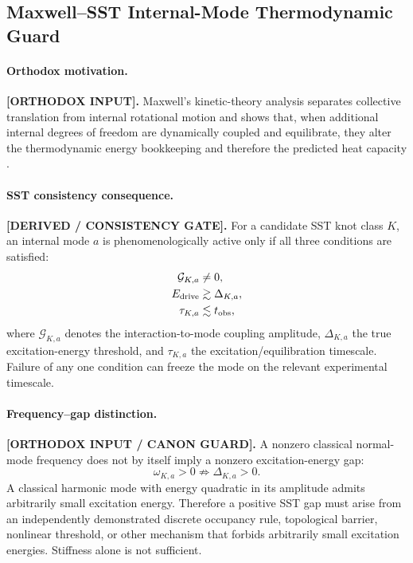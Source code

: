     \subsection{Maxwell--SST Internal-Mode Thermodynamic Guard}
        \label{subsec:maxwell_sst_internal_mode_guard}

        \paragraph{Orthodox motivation.}
        \textbf{[ORTHODOX INPUT].}
        Maxwell's kinetic-theory analysis separates collective translation from
        internal rotational motion and shows that, when additional internal
        degrees of freedom are dynamically coupled and equilibrate, they alter
        the thermodynamic energy bookkeeping and therefore the predicted heat
        capacity \cite{Maxwell1860GasesI,Maxwell1860GasesIIIII}.

        \paragraph{SST consistency consequence.}
        \textbf{[DERIVED / CONSISTENCY GATE].}
        For a candidate SST knot class $K$, an internal mode $a$ is
        phenomenologically active only if all three conditions are satisfied:
        \begin{align}
            \mathcal G_{K,a} &\neq 0,
            \label{eq:canon_mode_coupling_nonzero}\\
            E_{\rm drive} &\gtrsim \Delta_{K,a},
            \label{eq:canon_mode_kinematic_access}\\
            \tau_{K,a} &\lesssim t_{\rm obs},
            \label{eq:canon_mode_equilibration_time}
        \end{align}
        where $\mathcal G_{K,a}$ denotes the interaction-to-mode coupling
        amplitude, $\Delta_{K,a}$ the true excitation-energy threshold, and
        $\tau_{K,a}$ the excitation/equilibration timescale.  Failure of any one
        condition can freeze the mode on the relevant experimental timescale.

        \paragraph{Frequency--gap distinction.}
        \textbf{[ORTHODOX INPUT / CANON GUARD].}
        A nonzero classical normal-mode frequency does not by itself imply a
        nonzero excitation-energy gap:
        \begin{equation}
            \omega_{K,a}>0
            \not\Rightarrow
            \Delta_{K,a}>0 .
            \label{eq:canon_frequency_not_gap}
        \end{equation}
        A classical harmonic mode with energy quadratic in its amplitude admits
        arbitrarily small excitation energy.  Therefore a positive SST gap must
        arise from an independently demonstrated discrete occupancy rule,
        topological barrier, nonlinear threshold, or other mechanism that
        forbids arbitrarily small excitation energies.  Stiffness alone is not
        sufficient.

